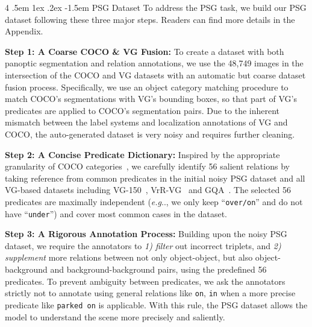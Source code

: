\documentclass[runningheads]{llncs}
\makeatletter
\renewcommand\paragraph{
  \@startsection{paragraph} {4} {\z@} {.5em \@plus1ex \@minus.2ex} {-1.5em} {\normalfont\normalsize\bfseries} }
\DeclareRobustCommand\onedot{\futurelet\@let@token\@onedot}
\def\@onedot{\ifx\@let@token.\else.\null\fi\xspace}
\def\eg{\emph{e.g}\onedot} \def\Eg{\emph{E.g}\onedot}
\makeatother
\begin{document}
\paragraph{PSG Dataset}
To address the PSG task, we build our PSG dataset following these three major steps. Readers can find more details in the Appendix.

\noindent\textbf{Step 1: A Coarse COCO \& VG Fusion:} 
To create a dataset with both panoptic segmentation and relation annotations, we use the 48,749 images in the intersection of the COCO and VG datasets with an automatic but coarse dataset fusion process.
Specifically, we use an object category matching procedure to match COCO's segmentations with VG's bounding boxes, so that part of VG's predicates are applied to COCO's segmentation pairs.
Due to the inherent mismatch between the label systems and localization annotations of VG and COCO, the auto-generated dataset is very noisy and requires further cleaning.

\noindent\textbf{Step 2: A Concise Predicate Dictionary:}
Inspired by the appropriate granularity of COCO categories~\cite{lin2014microsoft}, we carefully identify 56 salient relations by taking reference from common predicates in the initial noisy PSG dataset and all VG-based datasets including VG-150~\cite{xu2017scene}, VrR-VG~\cite{liang2019vrr} and GQA~\cite{hudson2019gqa}.
The selected 56 predicates are maximally independent (\eg, we only keep ``\texttt{over/on}'' and do not have ``\texttt{under}'') and cover most common cases in the dataset.

\noindent\textbf{Step 3: A Rigorous Annotation Process:}
Building upon the noisy PSG dataset, we require the annotators to
\emph{1) filter} out incorrect triplets, and
\emph{2) supplement} more relations between not only object-object, but also object-background and background-background pairs, using the predefined 56 predicates.
To prevent ambiguity between predicates, we ask the annotators strictly not to annotate using general relations like \texttt{on}, \texttt{in} when a more precise predicate like \texttt{parked on} is applicable.
With this rule, the PSG dataset allows the model to understand the scene more precisely and saliently.
\end{document}

